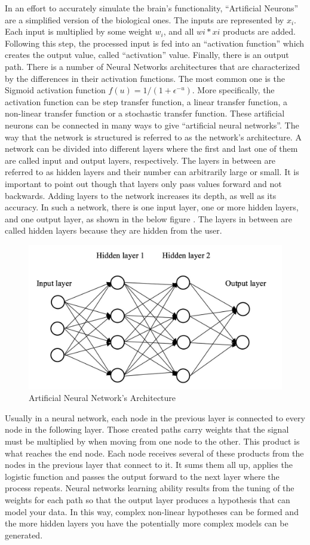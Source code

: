 In an effort to accurately simulate the brain’s functionality, “Artificial Neurons” are a simplified version of the biological ones. The inputs are represented by $x_{i}$. Each input is multiplied by some weight $w_{i}$, and all $w{i}*x{i}$ products are added. Following this step, the processed input is fed into an “activation function” which creates the output value, called “activation” value. Finally, there is an output path. There is a number of Neural Networks architectures that are characterized by the differences in their activation functions. The most common one is the Sigmoid activation function $f(u)=1/(1+ \epsilon^{-u})$. More specifically, the activation function can be step transfer function, a linear transfer function, a non-linear transfer function or a stochastic transfer function. These artificial neurons can be connected in many ways to give “artificial neural networks”. The way that the network is structured is referred to as the network’s architecture. A network can be divided into different layers where the first and last one of them are called input and output layers, respectively. The layers in between are referred to as hidden layers and their number can arbitrarily large or small. It is important to point out though that layers only pass values forward and not backwards. Adding layers to the network increases its depth, as well as its accuracy. In such a network, there is one input layer, one or more hidden layers, and one output layer, as shown in the below figure \cite{liu2018r}. The layers in between are called hidden layers because they are hidden from the user.
\begin{figure}[ht!]
\centering
\includegraphics[width=0.8\linewidth]{project/testw.JPG}

\caption{Artificial Neural Network's Architecture}
\end{figure}
\par Usually in a neural network, each node in the previous layer is connected to every node in the following layer. Those created paths carry weights that the signal must be multiplied by when moving from one node to the other. This product is what reaches the end node. Each node receives several of these products from the nodes in the previous layer that connect to it. It sums them all up, applies the logistic function and passes the output forward to the next layer where the process repeats. Neural networks learning ability results from the tuning of the weights for each path so that the output layer produces a hypothesis that can model your data. In this way, complex non-linear hypotheses can be formed and the more hidden layers you have the potentially more complex models can be generated. 
